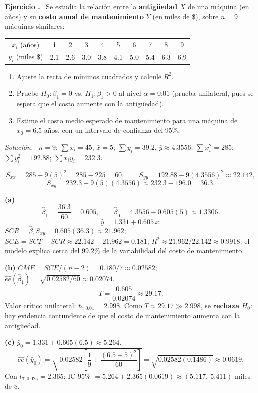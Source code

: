 \documentclass[11pt,a4paper]{article}
\newcounter{ejnum}
\newenvironment{ejercicio}{\refstepcounter{ejnum}\par\medskip\noindent\textbf{Ejercicio \theejnum.}~}{\par}
\newenvironment{solucion}{\par\noindent\textit{Solución.}~}{\par\vspace{1em}}
\begin{document}
\begin{ejercicio}
Se estudia la relación entre la \textbf{antigüedad} $X$ de una máquina (en años) y su \textbf{costo anual de mantenimiento} $Y$ (en miles de \$), sobre $n=9$ máquinas similares:

\begin{table}[htbp]
\centering
\begin{tabular}{c|ccccccccc}
\toprule
$x_i$ (años) & 1 & 2 & 3 & 4 & 5 & 6 & 7 & 8 & 9 \\
$y_i$ (miles \$) & 2.1 & 2.6 & 3.0 & 3.8 & 4.1 & 5.0 & 5.4 & 6.3 & 6.9 \\
\bottomrule
\end{tabular}
\end{table}

\begin{enumerate}[label=(\alph*)]
\item Ajuste la recta de mínimos cuadrados y calcule $R^2$.
\item Pruebe $H_0:\beta_1=0$ vs. $H_1:\beta_1>0$ al nivel $\alpha=0.01$ (prueba unilateral, pues se espera que el costo aumente con la antigüedad).
\item Estime el costo medio esperado de mantenimiento para una máquina de $x_0=6.5$ años, con un intervalo de confianza del 95\%.
\end{enumerate}
\end{ejercicio}

\begin{solucion}
$n=9$: $\sum x_i=45$, $\bar x=5$; $\sum y_i=39.2$, $\bar y\approx4.3556$; $\sum x_i^2=285$; $\sum y_i^2=192.88$; $\sum x_iy_i=232.3$.

\[
S_{xx}=285-9(5)^2=285-225=60, \qquad S_{yy}=192.88-9(4.3556)^2\approx22.142,
\]
\[
S_{xy}=232.3-9(5)(4.3556)\approx232.3-196.0=36.3.
\]

\textbf{(a)}
\[
\hat\beta_1=\frac{36.3}{60}=0.605, \qquad \hat\beta_0=4.3556-0.605(5)\approx1.3306.
\]
\[
\hat y = 1.331+0.605\,x.
\]
$SCR=\hat\beta_1S_{xy}=0.605(36.3)\approx21.962$; $SCE=SCT-SCR\approx22.142-21.962=0.181$; $R^2\approx21.962/22.142\approx0.9918$: el modelo explica cerca del $99.2\%$ de la variabilidad del costo de mantenimiento.

\textbf{(b)} $CME=SCE/(n-2)=0.180/7\approx0.02582$; $\widehat{ee}(\hat\beta_1)=\sqrt{0.02582/60}\approx0.02074$.
\[
T=\frac{0.605}{0.02074}\approx29.17.
\]
Valor crítico unilateral: $t_{7;0.01}=2.998$. Como $T\approx29.17\gg2.998$, se \textbf{rechaza} $H_0$: hay evidencia contundente de que el costo de mantenimiento aumenta con la antigüedad.

\textbf{(c)} $\hat y_0=1.331+0.605(6.5)\approx5.264$.
\[
\widehat{ee}(\hat y_0)=\sqrt{0.02582\left[\frac19+\frac{(6.5-5)^2}{60}\right]}=\sqrt{0.02582(0.1486)}\approx0.0619.
\]
Con $t_{7;0.025}=2.365$: IC 95\% $= 5.264\pm2.365(0.0619)\approx(5.117,\ 5.411)$ miles de \$.
\end{solucion}
\end{document}
